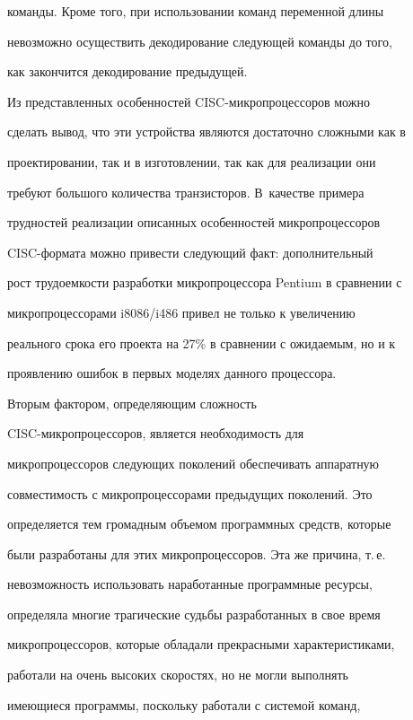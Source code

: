 команды. Кроме того, при использовании команд переменной длины 


невозможно осуществить декодирование следующей команды до того, 


как закончится декодирование предыдущей. 





Из представленных особенностей CISC-микропроцессоров можно 


сделать вывод, что эти устройства являются достаточно сложными как в 


проектировании, так и в изготовлении, так как для реализации они 


требуют большого количества транзисторов.  В~качестве примера 


трудностей реализации описанных особенностей микропроцессоров 


CISC-фор\-ма\-та можно привести следующий факт: дополнительный 


рост трудоемкости разработки микропроцессора Pentium в сравнении с 


микропроцессорами i8086/\!i486 привел не только к увеличению  


реального срока его проекта на 27\% в сравнении с ожидаемым, но и к 


проявлению ошибок в первых моделях данного процессора.  


 


 Вторым фактором, определяющим сложность 


 CISC-мик\-ро\-про\-цес\-со\-ров, является необходимость для 


микропроцессоров следующих поколений обеспечивать аппаратную 


совместимость с микропроцессорами предыдущих поколений. Это 


определяется тем громадным объемом программных средств, которые 


были разработаны для этих микропроцессоров. Эта же причина, т.\,е.\ 


невозможность использовать наработанные программные ресурсы, 


определяла многие трагические судьбы разработанных в свое время 


микропроцессоров, которые обладали прекрасными характеристиками, 


работали на очень высоких скоростях, но не могли выполнять 


имеющиеся программы, поскольку работали с системой команд, 



